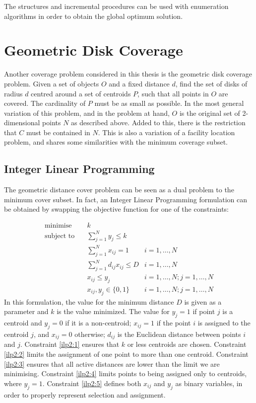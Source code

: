 The structures and incremental procedures can be used with enumeration algorithms in order to obtain the global optimum solution.

\section{Geometric Disk Coverage}
\label{ilp2}
Another coverage problem considered in this thesis is the geometric disk coverage problem. Given a set of objects $O$ and a fixed distance $d$, find the set of disks of radius $d$ centred around a set of centroids $P$, such that all points in $O$ are covered. The cardinality of $P$ must be as small as possible. In the most general variation of this problem, and in the problem at hand, $O$ is the original set of 2-dimensional points $N$ as described above. Added to this, there is the restriction that $C$ must be contained in $N$. This is also a variation of a facility location problem, and shares some similarities with the minimum coverage subset. 

\subsection{Integer Linear Programming}
The geometric distance cover problem can be seen as a dual problem to the minimum cover subset. In fact, an Integer Linear Programming formulation can be obtained by swapping the objective function for one of the constraints:

\begin{align}
\text{minimise}   \quad& k							   &\\
\text{subject to} \quad
& \sum\limits_{j=1}^{N}{y_j} \leq k 
& 							\label{ilp2:1}\\
& \sum\limits_{j=1}^{N}{x_{ij}}	= 1   
& i=1,\ldots,N 				\label{ilp2:2}\\
& \sum\limits_{j=1}^{N}{d_{ij} x_{ij}} \leq D
& i=1,\ldots,N				\label{ilp2:3}\\
& x_{ij} \leq y_{j}				   
& i=1,\ldots,N;j=1,\ldots,N	\label{ilp2:4}\\
& x_{ij},y_{j} \in \{0,1\}
& i=1,\ldots,N;j=1,\ldots,N \label{ilp2:5}
\end{align}
In this formulation, the value for the minimum distance $D$ is given as a parameter and $k$ is the value minimized. The value for $y_j = 1$ if point $j$ is a centroid and $y_j = 0$ if it is a non-centroid;
$x_{ij} = 1$ if the point $i$ is assigned to the centroid $j$, and $x_{ij}=0$ otherwise;
$d_{ij}$ is the Euclidean distance between points $i$ and $j$.
Constraint \eqref{ilp2:1} ensures that $k$ or less centroids are chosen.
Constraint \eqref{ilp2:2} limits the assignment of one point to more than one centroid.
Constraint \eqref{ilp2:3} ensures that all active distances are lower than the limit we are minimising.
Constraint \eqref{ilp2:4} limits points to being assigned only to centroids, where $y_j=1$.
Constraint \eqref{ilp2:5} defines both $x_{ij}$ and $y_j$ as binary variables, in order to properly represent selection and assignment.

